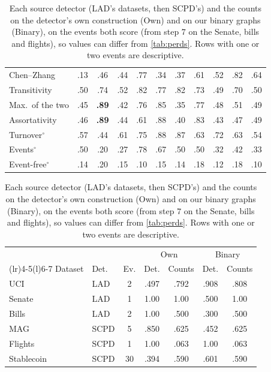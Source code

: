 \documentclass[11pt]{article}
\let\dsmidrule\midrule
\renewcommand{\midrule}{\arrayrulecolor{dsrule}\dsmidrule\arrayrulecolor{dsnavy}}
\let\dscmidrule\cmidrule
\renewcommand{\cmidrule}{\arrayrulecolor{dsrule}\dscmidrule}
\theoremstyle{dsplain}
\theoremstyle{definition}
\begin{document}
\begin{table}[!t]
\begin{minipage}[t]{0.6\textwidth}
\begin{tabular}{lcccccccccc}
    Chen--Zhang & .13 & .46 & .44 & .77 & .34 & .37 & .61 & .52 & .82 & .64 \\
    \midrule
    Transitivity & .50 & .74 & .52 & .82 & .77 & .82 & .73 & .49 & .70 & .50 \\
    Max.\ of the two & .45 & \textbf{.89} & .42 & .76 & .85 & .35 & .77 & .48 & .51 & .49 \\
    Assortativity & .46 & \textbf{.89} & .44 & .61 & .88 & .40 & .83 & .43 & .47 & .49 \\
    \midrule
    Turnover$^\circ$ & .57 & .44 & .61 & .75 & .88 & .87 & .63 & .72 & .63 & .54 \\
    \midrule
    Events$^\circ$ & .50 & .20 & .27 & .78 & .67 & .50 & .50 & .32 & .42 & .33 \\
    Event-free$^\circ$ & .14 & .20 & .15 & .10 & .15 & .14 & .18 & .12 & .18 & .10 \\
    \bottomrule
  \end{tabular}
  \end{minipage}\hfill
  \begin{minipage}[t]{0.38\textwidth}
  \centering\captionsetup{justification=raggedright,singlelinecheck=false}
  \caption{Each source detector (LAD's datasets, then SCPD's) and the counts on the detector's own
  construction (Own) and on our binary graphs (Binary), on the events both score (from step $7$ on the
  Senate, bills and flights), so values can differ from \cref{tab:perds}. Rows with one or two events
  are descriptive.}
  \label{tab:own}
  \scriptsize
  \setlength{\tabcolsep}{2.6pt}
  \begin{tabular}{llccccc}
    \toprule
    & & & \multicolumn{2}{c}{Own} & \multicolumn{2}{c}{Binary} \\
    \cmidrule(lr){4-5}\cmidrule(l){6-7}
    Dataset & Det. & Ev. & Det. & Counts & Det. & Counts \\
    \midrule
    UCI & LAD & 2 & .497 & .792 & .908 & .808 \\
    Senate & LAD & 1 & 1.00 & 1.00 & .500 & 1.00 \\
    Bills & LAD & 2 & 1.00 & .500 & .300 & .500 \\
    MAG & SCPD & 5 & .850 & .625 & .452 & .625 \\
    Flights & SCPD & 1 & 1.00 & .063 & 1.00 & .063 \\
    Stablecoin & SCPD & 30 & .394 & .590 & .601 & .590 \\
    \bottomrule
  \end{tabular}
  \end{minipage}
\end{table}
\end{document}
